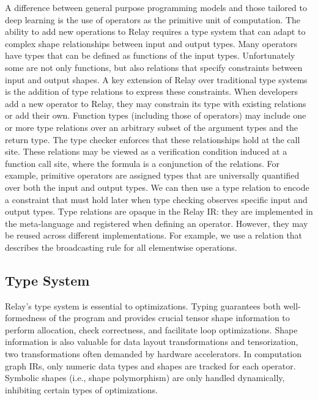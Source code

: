       A difference between general purpose programming models and those tailored to deep learning
        is the use of operators as the primitive unit of computation.
      The ability to add new operations to Relay requires a type system that can adapt to
        complex shape relationships between input and output types.
      Many operators have types that can be defined
        as functions of the input types.
      Unfortunately some are not only functions,
        but also relations that specify constraints between input and output shapes.
      A key extension of Relay over traditional type systems is the addition of type relations
        to express these constraints.
      When developers add a new operator to Relay, they may constrain its
        type with existing relations or add their own.
      Function types (including those of operators) may include
        one or more type relations over an arbitrary subset of the argument types and the return type.
      The type checker enforces that these relationships hold at the call site.
      These relations may be viewed as a verification condition induced at a
        function call site, where the formula is a conjunction of the relations.
      For example, primitive operators are assigned types that are universally quantified over
        both the input and output types.
      We can then use a type relation to encode a constraint that must hold later
        when type checking observes specific input and output types.
      Type relations are opaque in the Relay IR: they are implemented in the
        meta-language and registered when defining an operator.
      However, they may be reused across different implementations.
      For example, we use a relation that describes the
        broadcasting rule for all elementwise operations.

        \subsection{Type System}
        \label{subsec:type_system}

        Relay's type system is essential
          to optimizations.
        Typing guarantees both well-formedness of the program
          and provides crucial tensor shape information to perform allocation,
          check correctness, and facilitate loop optimizations.
        Shape information is also valuable for data layout transformations and tensorization,
          two transformations often demanded by hardware accelerators.
        In computation graph IRs, only numeric data types
          and shapes are tracked for each operator.
        Symbolic shapes (i.e., shape polymorphism) are only handled
          dynamically, inhibiting certain types of optimizations.

